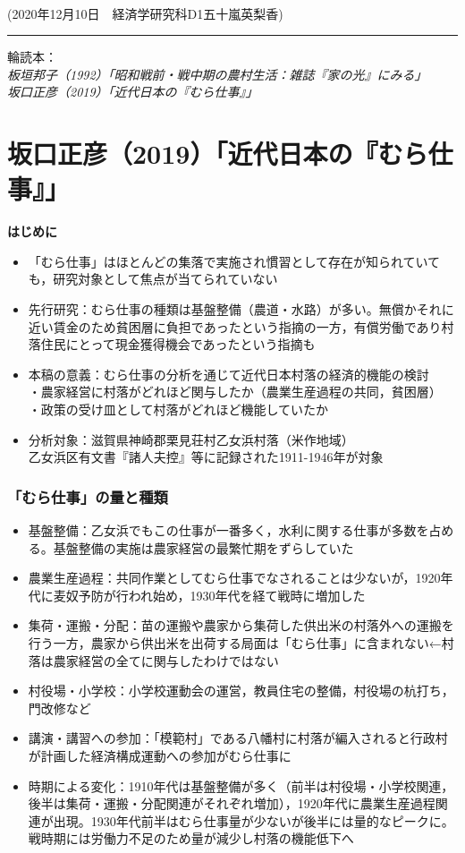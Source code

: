 \documentclass[11pt,autodetect-engine]{jsarticle}%
\begin{document}
 \\
\hfill  (2020年12月10日　経済学研究科D1五十嵐英梨香)\\
\noindent \rule{\textwidth}{0.2mm} 
輪読本：\\
{\large {\it 板垣邦子（1992）「昭和戦前・戦中期の農村生活：雑誌『家の光』にみる」}}\\
{\large {\it 坂口正彦（2019）「近代日本の『むら仕事』」}}\\

\part{坂口正彦（2019）「近代日本の『むら仕事』」}
{\bf 
\Large はじめに}
\large\begin{itemize}
  \item 「むら仕事」はほとんどの集落で実施され慣習として存在が知られていても，研究対象として焦点が当てられていない
  \item 先行研究：むら仕事の種類は基盤整備（農道・水路）が多い。無償かそれに近い賃金のため貧困層に負担であったという指摘の一方，有償労働であり村落住民にとって現金獲得機会であったという指摘も
  \item 本稿の意義：むら仕事の分析を通じて近代日本村落の経済的機能の検討
  \\・農家経営に村落がどれほど関与したか（農業生産過程の共同，貧困層）
  \\・政策の受け皿として村落がどれほど機能していたか
  \item 分析対象：滋賀県神崎郡栗見荘村乙女浜村落（米作地域）
  \\乙女浜区有文書『諸人夫控』等に記録された1911-1946年が対象
\end{itemize}

 \section{「むら仕事」の量と種類}
 
\begin{itemize}
  \item 基盤整備：乙女浜でもこの仕事が一番多く，水利に関する仕事が多数を占める。基盤整備の実施は農家経営の最繁忙期をずらしていた
  \item 農業生産過程：共同作業としてむら仕事でなされることは少ないが，1920年代に麦奴予防が行われ始め，1930年代を経て戦時に増加した
  \item 集荷・運搬・分配：苗の運搬や農家から集荷した供出米の村落外への運搬を行う一方，農家から供出米を出荷する局面は「むら仕事」に含まれない←村落は農家経営の全てに関与したわけではない
  \item 村役場・小学校：小学校運動会の運営，教員住宅の整備，村役場の杭打ち，門改修など
  \item 講演・講習への参加：「模範村」である八幡村に村落が編入されると行政村が計画した経済構成運動への参加がむら仕事に
  \item 時期による変化：1910年代は基盤整備が多く（前半は村役場・小学校関連，後半は集荷・運搬・分配関連がそれぞれ増加），1920年代に農業生産過程関連が出現。1930年代前半はむら仕事量が少ないが後半には量的なピークに。戦時期には労働力不足のため量が減少し村落の機能低下へ
\end{itemize}
\end{document}
